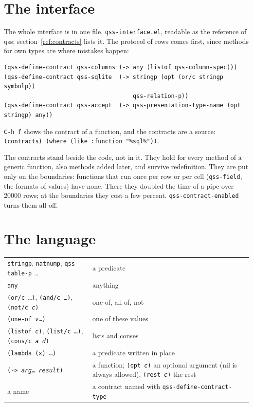 \documentclass[
  paper=a4, fontsize=11pt, parskip=half, headings=small,
  toc=bibliography, numbers=noenddot, DIV=12
]{scrreprt}
\newcommand{\code}[1]{\texttt{#1}}
\newcommand{\file}[1]{\texttt{#1}}
\newcommand{\kbd}[1]{\texttt{#1}}
\newcommand{\qss}{\textsf{qss}}
\begin{document}
\section{The interface}

The whole interface is in one file, \file{qss-interface.el}, readable as the
reference of \qss; section~\ref{ref:contracts} lists it. The protocol of rows
comes first, since methods for own types are where mistakes happen:

\begin{lstlisting}
(qss-define-contract qss-columns (-> any (listof qss-column-spec)))
(qss-define-contract qss-sqlite  (-> stringp (opt (or/c stringp symbolp))
                                     qss-relation-p))
(qss-define-contract qss-accept  (-> qss-presentation-type-name (opt stringp) any))
\end{lstlisting}

\kbd{C-h f} shows the contract of a function, and the contracts are a source:
\code{(contracts) (where (like :function "\%sql\%"))}.

The contracts stand beside the code, not in it. They hold for every method of a
generic function, also methods added later, and survive redefinition. They are
put only on the boundaries: functions that run once per row or per cell
(\code{qss-field}, the formats of values) have none. There they doubled the time
of a pipe over 20000 rows; at the boundaries they cost a few percent.
\code{qss-contract-enabled} turns them all off.

\section{The language}

\noindent\begin{tabularx}{\linewidth}{@{}lX@{}}
\toprule
\code{stringp}, \code{natnump}, \code{qss-table-p} \ldots & a predicate \\
\code{any} & anything \\
\code{(or/c \ldots)}, \code{(and/c \ldots)}, \code{(not/c \emph{c})} & one of, all of, not \\
\code{(one-of \emph{v}\ldots)} & one of these values \\
\code{(listof \emph{c})}, \code{(list/c \ldots)}, \code{(cons/c \emph{a} \emph{d})} & lists and conses \\
\code{(lambda (x) \ldots)} & a predicate written in place \\
\code{(-> \emph{arg}\ldots{} \emph{result})} & a function; \code{(opt \emph{c})} an optional argument (nil is always allowed), \code{(rest \emph{c})} the rest \\
a name & a contract named with \code{qss-define-contract-type} \\
\bottomrule
\end{tabularx}
\end{document}
